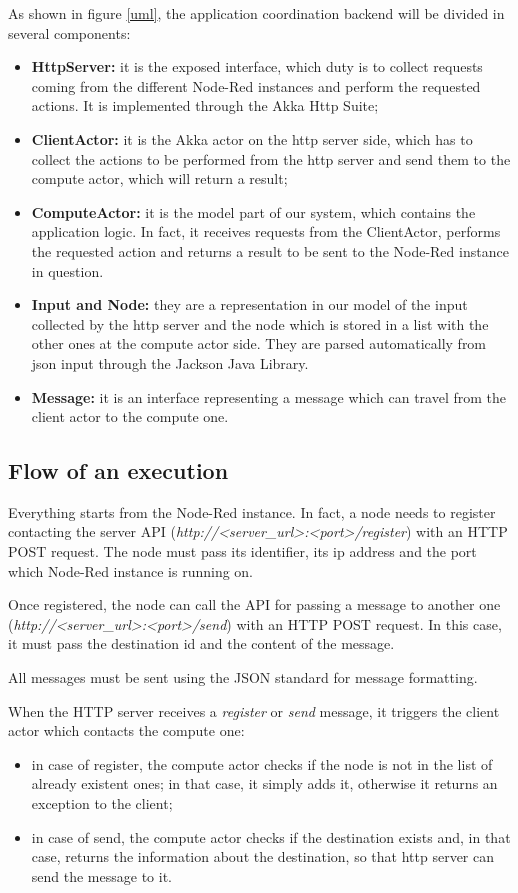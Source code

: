 \documentclass[table, 12pt]{article}
\begin{document}
As shown in figure \ref{uml}, the application coordination backend will be divided in several components:
\begin{itemize}
    \item \textbf{HttpServer:} it is the exposed interface, which duty is to collect requests coming from the different Node-Red instances and perform the requested actions. It is implemented through the Akka Http Suite;
    \item \textbf{ClientActor:} it is the Akka actor on the http server side, which has to collect the actions to be performed from the http server and send them to the compute actor, which will return a result;
    \item \textbf{ComputeActor:} it is the model part of our system, which contains the application logic. In fact, it receives requests from the ClientActor, performs the requested action and returns a result to be sent to the Node-Red instance in question.
    \item \textbf{Input and Node:} they are a representation in our model of the input collected by the http server and the node which is stored in a list with the other ones at the compute actor side. They are parsed automatically from json input through the Jackson Java Library.
    \item \textbf{Message:} it is an interface representing a message which can travel from the client actor to the compute one.
\end{itemize}

\subsection{Flow of an execution}
Everything starts from the Node-Red instance. In fact, a node needs to register contacting the server API (\textit{http://<server\_url>:<port>/register}) with an HTTP POST request.
The node must pass its identifier, its ip address and the port which Node-Red instance is running on.

Once registered, the node can call the API for passing a message to another one (\textit{http://<server\_url>:<port>/send}) with an HTTP POST request. In this case, it must pass the destination id and the content of the message.

All messages must be sent using the JSON standard for message formatting.

When the HTTP server receives a \textit{register} or \textit{send} message, it triggers the client actor which contacts the compute one:
\begin{itemize}
    \item in case of register, the compute actor checks if the node is not in the list of already existent ones; in that case, it simply adds it, otherwise it returns an exception to the client;
    \item in case of send, the compute actor checks if the destination exists and, in that case, returns the information about the destination, so that http server can send the message to it.
\end{itemize}
\end{document}
